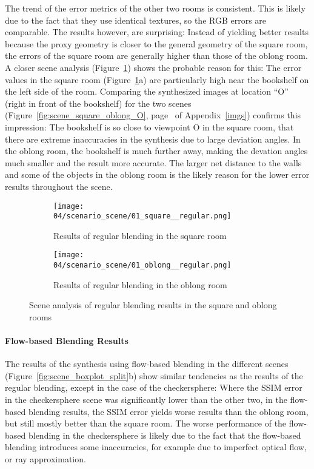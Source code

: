 The trend of the error metrics of the other two rooms is consistent. This is likely due to the fact that they use identical textures, so the RGB errors are comparable. The results however, are surprising: Instead of yielding better results because the proxy geometry is closer to the general geometry of the square room, the errors of the square room are generally higher than those of the oblong room. A closer scene analysis (Figure~\ref{fig:scene_regular_square_oblong}) shows the probable reason for this: The error values in the square room (Figure~\ref{fig:scene_regular_square_oblong}a) are particularly high near the bookshelf on the left side of the room. Comparing the synthesized images at location ``O'' (right in front of the bookshelf) for the two scenes (Figure~\ref{fig:scene_square_oblong_O}, page~\pageref{fig:scene_square_oblong_O} of Appendix~\ref{imgs}) confirms this impression: The bookshelf is so close to viewpoint O in the square room, that there are extreme inaccuracies in the synthesis due to large deviation angles. In the oblong room, the bookshelf is much further away, making the devation angles much smaller and the result more accurate. The larger net distance to the walls and some of the objects in the oblong room is the likely reason for the lower error results throughout the scene.

\begin{figure}
\centering
    \hfill
    \begin{subfigure}[b]{0.45\textwidth}
            \centering
            \texttt{[image: 04/scenario\_scene/01\_square\_\_regular.png]}
            \caption{Results of regular blending in the square room}
    \end{subfigure}
    \hfill
    \begin{subfigure}[b]{0.45\textwidth}
            \centering
            \texttt{[image: 04/scenario\_scene/01\_oblong\_\_regular.png]}
            \caption{Results of regular blending in the oblong room}
    \end{subfigure}
    \hfill
  \caption{Scene analysis of regular blending results in the square and oblong rooms} \label{fig:scene_regular_square_oblong}
\end{figure}

\paragraph{Flow-based Blending Results}
The results of the synthesis using flow-based blending in the different scenes (Figure~\ref{fig:scene_boxplot_split}b) show similar tendencies as the results of the regular blending, except in the case of the checkersphere: Where the SSIM error in the checkersphere scene was significantly lower than the other two, in the flow-based blending results, the SSIM error yields worse results than the oblong room, but still mostly better than the square room. The worse performance of the flow-based blending in the checkersphere is likely due to the fact that the flow-based blending introduces some inaccuracies, for example due to imperfect optical flow, or ray approximation.

